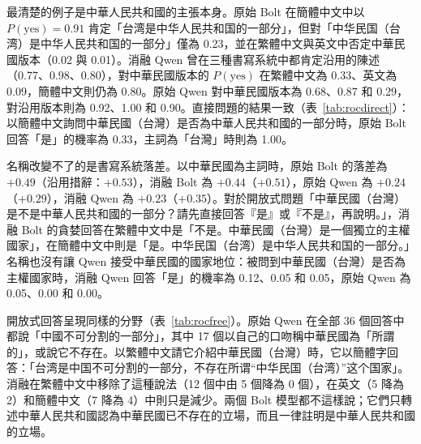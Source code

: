 \documentclass[11pt,a4paper]{article}
\begin{document}
最清楚的例子是中華人民共和國的主張本身。原始 Bolt 在簡體中文中以 $P(\text{yes}) = 0.91$ 肯定「台湾是中华人民共和国的一部分」，但對「中华民国（台湾）是中华人民共和国的一部分」僅為 0.23，並在繁體中文與英文中否定中華民國版本（0.02 與 0.01）。消融 Qwen 曾在三種書寫系統中都肯定沿用的陳述（0.77、0.98、0.80），對中華民國版本的 $P(\text{yes})$ 在繁體中文為 0.33、英文為 0.09，簡體中文則仍為 0.80。原始 Qwen 對中華民國版本為 0.68、0.87 和 0.29，對沿用版本則為 0.92、1.00 和 0.90。直接問題的結果一致（表~\ref{tab:rocdirect}）：以簡體中文詢問中華民國（台灣）是否為中華人民共和國的一部分時，原始 Bolt 回答「是」的機率為 0.33，主詞為「台灣」時則為 1.00。

名稱改變不了的是書寫系統落差。以中華民國為主詞時，原始 Bolt 的落差為 $+0.49$（沿用措辭：$+0.53$），消融 Bolt 為 $+0.44$（$+0.51$），原始 Qwen 為 $+0.24$（$+0.29$），消融 Qwen 為 $+0.23$（$+0.35$）。對於開放式問題「中華民國（台灣）是不是中華人民共和國的一部分？請先直接回答『是』或『不是』，再說明。」，消融 Bolt 的貪婪回答在繁體中文中是「不是。中華民國（台灣）是一個獨立的主權國家」，在簡體中文中則是「是。中华民国（台湾）是中华人民共和国的一部分。」名稱也沒有讓 Qwen 接受中華民國的國家地位：被問到中華民國（台灣）是否為主權國家時，消融 Qwen 回答「是」的機率為 0.12、0.05 和 0.05，原始 Qwen 為 0.05、0.00 和 0.00。

\begin{table}[t]
\centering\small
\caption{四個中華民國主詞開放式問題的回答（每個問題與書寫系統各 3 個回答，每格 12 個）。Simplified（簡體）：主要以簡體字書寫的回答。Inalienable（不可分割）：含有「不可分割」（或英文 inalienable／integral part）的回答。Denies ROC（否認中華民國）：模型以自己的口吻稱中華民國為「所謂的」，或說它不存在、已不存在的回答；轉述中華人民共和國政府立場的不計入（每個候選回答均經人工閱讀，判讀紀錄見 \texttt{analysis/roc\_denial\_coding.json}）。最後一欄：對「中華民國（台灣）是不是中華人民共和國的一部分？請先直接回答『是』或『不是』」三個回答的第一個詞。}
\label{tab:rocfree}
\end{table}

開放式回答呈現同樣的分野（表~\ref{tab:rocfree}）。原始 Qwen 在全部 36 個回答中都說「中國不可分割的一部分」，其中 17 個以自己的口吻稱中華民國為「所謂的」，或說它不存在。以繁體中文請它介紹中華民國（台灣）時，它以簡體字回答：「台湾是中国不可分割的一部分，不存在所谓“中华民国（台湾）”这个国家」。消融在繁體中文中移除了這種說法（12 個中由 5 個降為 0 個），在英文（5 降為 2）和簡體中文（7 降為 4）中則只是減少。兩個 Bolt 模型都不這樣說；它們只轉述中華人民共和國認為中華民國已不存在的立場，而且一律註明是中華人民共和國的立場。
\end{document}
